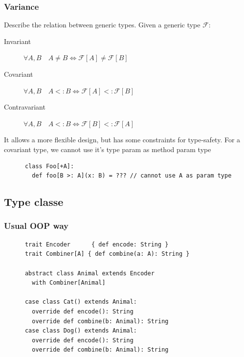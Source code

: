 \begin{frame}[fragile]
  \frametitle{Variance}

  \begin{definition}[Variance]
    Describe the relation between generic types. Given a generic type \(\mathcal{F}\):
    \begin{description}
      \item[Invariant] \(\forall A,B\quad A \neq B \Leftrightarrow \mathcal{F}[A] \neq \mathcal{F}[B]\)
      \item[Covariant] \(\forall A,B\quad A <: B \Leftrightarrow \mathcal{F}[A] <: \mathcal{F}[B]\)
      \item[Contravariant] \(\forall A,B\quad A <: B \Leftrightarrow \mathcal{F}[B] <: \mathcal{F}[A]\)
    \end{description}
  \end{definition}

  It allows a more flexible design, but has some constraints for type-safety. For a covariant type, we cannot use it's type param as method param type

  \begin{example}
    \begin{lstlisting}
      class Foo[+A]:
        def foo[B >: A](x: B) = ??? // cannot use A as param type
    \end{lstlisting}
  \end{example}

\end{frame}

\subsection{Type classe}

\begin{frame}[fragile]
  \frametitle{Usual OOP way}

  \begin{example}[Inheritance]
    \begin{lstlisting}
      trait Encoder      { def encode: String }
      trait Combiner[A] { def combine(a: A): String }

      abstract class Animal extends Encoder
        with Combiner[Animal]

      case class Cat() extends Animal:
        override def encode(): String
        override def combine(b: Animal): String
      case class Dog() extends Animal:
        override def encode(): String
        override def combine(b: Animal): String
    \end{lstlisting}
  \end{example}
\end{frame}

